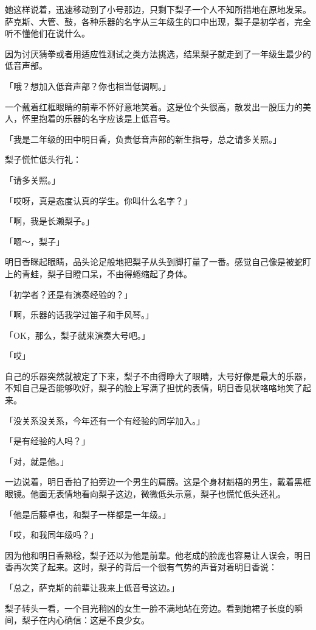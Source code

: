 \documentclass[UTF8]{ctexart}
\begin{document}
    她这样说着，迅速移动到了小号那边，只剩下梨子一个人不知所措地在原地发呆。萨克斯、大管、鼓，各种乐器的名字从三年级生的口中出现，梨子是初学者，完全听不懂他们在说什么。

    因为讨厌猜拳或者用适应性测试之类方法挑选，结果梨子就走到了一年级生最少的低音声部。

    「哦？想加入低音声部？你也相当低调啊。」

    一个戴着红框眼睛的前辈不怀好意地笑着。这是位个头很高，散发出一股压力的美人，怀里抱着的乐器的名字应该是上低音号。

    「我是二年级的田中明日香，负责低音声部的新生指导，总之请多关照。」

    梨子慌忙低头行礼：

    「请多关照。」

    「哎呀，真是态度认真的学生。你叫什么名字？」

    「啊，我是长濑梨子。」

    「嗯～，梨子」

    明日香眯起眼睛，品头论足般地把梨子从头到脚打量了一番。感觉自己像是被蛇盯上的青蛙，梨子目瞪口呆，不由得蜷缩起了身体。

    「初学者？还是有演奏经验的？」

    「啊，乐器的话我学过笛子和手风琴。」

    「OK，那么，梨子就来演奏大号吧。」

    「哎」

    自己的乐器突然就被定了下来，梨子不由得睁大了眼睛，大号好像是最大的乐器，不知自己是否能够吹好，梨子的脸上写满了担忧的表情，明日香见状咯咯地笑了起来。

    「没关系没关系，今年还有一个有经验的同学加入。」

    「是有经验的人吗？」

    「对，就是他。」

    一边说着，明日香拍了拍旁边一个男生的肩膀。这是个身材魁梧的男生，戴着黑框眼镜。他面无表情地看向梨子这边，微微低头示意，梨子也慌忙低头还礼。

    「他是后藤卓也，和梨子一样都是一年级。」

    「哎，和我同年级吗？」

    因为他和明日香熟稔，梨子还以为他是前辈。他老成的脸庞也容易让人误会，明日香再次笑了起来。这时，梨子的背后一个很有气势的声音对着明日香说：

    「总之，萨克斯的前辈让我来上低音号这边。」

    梨子转头一看，一个目光稍凶的女生一脸不满地站在旁边。看到她裙子长度的瞬间，梨子在内心确信：这是不良少女。
\end{document}

